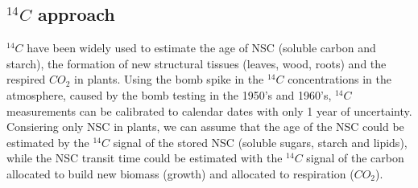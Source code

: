 \documentclass{article}
\begin{document}
%




\subsection {$^{14}C$ approach}

$^{14}C$ have been widely used to estimate the age of  NSC (soluble carbon and starch), the formation of new structural tissues (leaves, wood, roots) and the respired $CO_{2}$ in plants.
Using the bomb spike in the $^{14}C$ concentrations in the atmosphere, caused by the bomb testing in the 1950's and 1960's, $^{14}C$ measurements can be calibrated to calendar dates with only 1 year of uncertainty. 
Consiering only NSC in plants, we can assume that the age of the NSC could be estimated by the $^{14}C$ signal of the stored NSC (soluble sugars, starch and lipids), while the NSC transit time could be estimated with the $^{14}C$ signal of the carbon allocated to build new biomass (growth) and allocated to respiration ($CO_{2}$).
\end{document}
